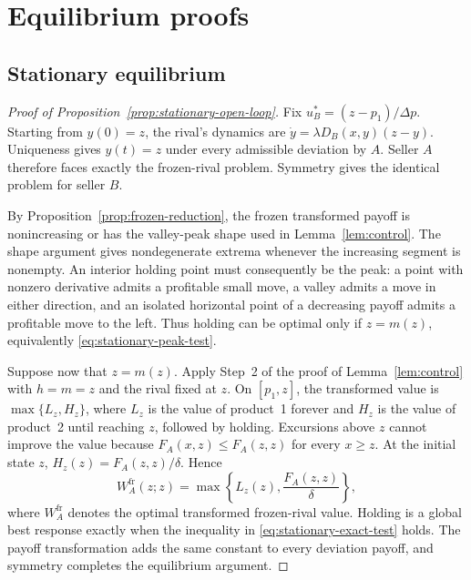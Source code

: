 \documentclass[11pt]{article}
\theoremstyle{definition}
\begin{document}
\section{Equilibrium proofs}\label{app:equilibrium}

\subsection{Stationary equilibrium}\label{app:stationary}

\begin{proof}[Proof of Proposition~\ref{prop:stationary-open-loop}]
Fix $u_B^*=(z-p_1)/\Delta p$. Starting from $y(0)=z$, the rival's dynamics
are $\dot y=\lambda D_B(x,y)(z-y)$. Uniqueness gives $y(t)=z$ under every
admissible deviation by $A$. Seller $A$ therefore faces exactly the
frozen-rival problem. Symmetry gives the identical problem for seller $B$.

By Proposition~\ref{prop:frozen-reduction}, the frozen transformed payoff
is nonincreasing or has the valley-peak shape used in
Lemma~\ref{lem:control}. The shape argument gives nondegenerate extrema
whenever the increasing segment is nonempty. An interior holding point
must consequently be the peak: a point with nonzero derivative admits a
profitable small move, a valley admits a move in either direction, and an
isolated horizontal point of a decreasing payoff admits a profitable move
to the left. Thus holding can be optimal only if $z=m(z)$, equivalently
\eqref{eq:stationary-peak-test}.

Suppose now that $z=m(z)$. Apply Step~2 of the proof of
Lemma~\ref{lem:control} with $h=m=z$ and the rival fixed at $z$. On
$[p_1,z]$, the transformed value is $\max\{L_z,H_z\}$, where $L_z$ is
the value of product~1 forever and $H_z$ is the value of product~2 until
reaching $z$, followed by holding. Excursions above $z$ cannot improve
the value because $F_A(x,z)\leq F_A(z,z)$ for every $x\geq z$.
At the initial state $z$, $H_z(z)=F_A(z,z)/\delta$. Hence
\begin{equation*}
W_A^{\mathrm{fr}}(z;z)
=\max\left\{L_z(z),\frac{F_A(z,z)}{\delta}\right\},
\end{equation*}
where $W_A^{\mathrm{fr}}$ denotes the optimal transformed frozen-rival
value. Holding is a global best response exactly when the inequality in
\eqref{eq:stationary-exact-test} holds. The payoff transformation adds
the same constant to every deviation payoff, and symmetry completes the
equilibrium argument.
\end{proof}
\end{document}
